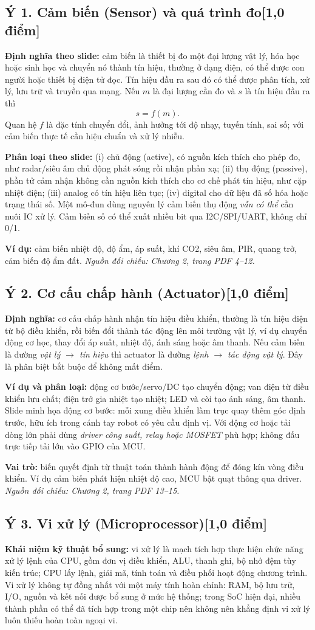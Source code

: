 \documentclass[12pt,a4paper]{article}
\newcommand{\muc}[1]{\subsection*{#1\hfill{\color{teal}\normalsize [1,0 điểm]}}}
\newcommand{\nguon}[1]{{\small\itshape\color{navy}Nguồn đối chiếu: #1.}}
\begin{document}
\muc{Ý 1. Cảm biến (Sensor) và quá trình đo}
\textbf{Định nghĩa theo slide:} cảm biến là thiết bị đo một đại lượng vật lý, hóa học hoặc sinh học và chuyển nó thành tín hiệu, thường ở dạng điện, có thể được con người hoặc thiết bị điện tử đọc. Tín hiệu đầu ra sau đó có thể được phân tích, xử lý, lưu trữ và truyền qua mạng. Nếu $m$ là đại lượng cần đo và $s$ là tín hiệu đầu ra thì
\[
\boxed{s=f(m).}
\]
Quan hệ $f$ là đặc tính chuyển đổi, ảnh hưởng tới độ nhạy, tuyến tính, sai số; với cảm biến thực tế cần hiệu chuẩn và xử lý nhiễu.

\textbf{Phân loại theo slide:} (i) chủ động (active), có nguồn kích thích cho phép đo, như radar/siêu âm chủ động phát sóng rồi nhận phản xạ; (ii) thụ động (passive), phần tử cảm nhận không cần nguồn kích thích cho cơ chế phát tín hiệu, như cặp nhiệt điện; (iii) analog có tín hiệu liên tục; (iv) digital cho dữ liệu đã số hóa hoặc trạng thái số. Một mô-đun dùng nguyên lý cảm biến thụ động \emph{vẫn có thể} cần nuôi IC xử lý. Cảm biến số có thể xuất nhiều bit qua I2C/SPI/UART, không chỉ 0/1.

\textbf{Ví dụ:} cảm biến nhiệt độ, độ ẩm, áp suất, khí CO2, siêu âm, PIR, quang trở, cảm biến độ ẩm đất. \nguon{Chương 2, trang PDF 4--12}

\muc{Ý 2. Cơ cấu chấp hành (Actuator)}
\textbf{Định nghĩa:} cơ cấu chấp hành nhận tín hiệu điều khiển, thường là tín hiệu điện từ bộ điều khiển, rồi biến đổi thành tác động lên môi trường vật lý, ví dụ chuyển động cơ học, thay đổi áp suất, nhiệt độ, ánh sáng hoặc âm thanh. Nếu cảm biến là đường \emph{vật lý $\to$ tín hiệu} thì actuator là đường \emph{lệnh $\to$ tác động vật lý}. Đây là phân biệt bắt buộc để không mất điểm.

\textbf{Ví dụ và phân loại:} động cơ bước/servo/DC tạo chuyển động; van điện từ điều khiển lưu chất; điện trở gia nhiệt tạo nhiệt; LED và còi tạo ánh sáng, âm thanh. Slide minh họa động cơ bước: mỗi xung điều khiển làm trục quay thêm góc định trước, hữu ích trong cánh tay robot có yêu cầu định vị. Với động cơ hoặc tải dòng lớn phải dùng \emph{driver công suất, relay hoặc MOSFET} phù hợp; không đấu trực tiếp tải lớn vào GPIO của MCU.

\textbf{Vai trò:} biến quyết định từ thuật toán thành hành động để đóng kín vòng điều khiển. Ví dụ cảm biến phát hiện nhiệt độ cao, MCU bật quạt thông qua driver. \nguon{Chương 2, trang PDF 13--15}

\muc{Ý 3. Vi xử lý (Microprocessor)}
\textbf{Khái niệm kỹ thuật bổ sung:} vi xử lý là mạch tích hợp thực hiện chức năng xử lý lệnh của CPU, gồm đơn vị điều khiển, ALU, thanh ghi, bộ nhớ đệm tùy kiến trúc; CPU lấy lệnh, giải mã, tính toán và điều phối hoạt động chương trình. Vi xử lý không tự đồng nhất với một máy tính hoàn chỉnh: RAM, bộ lưu trữ, I/O, nguồn và kết nối được bổ sung ở mức hệ thống; trong SoC hiện đại, nhiều thành phần có thể đã tích hợp trong một chip nên không nên khẳng định vi xử lý luôn thiếu hoàn toàn ngoại vi.
\end{document}
